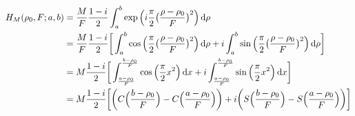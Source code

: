         \begin{align*}
            H_{M}(\rho_0,F;a,b)
            &=\frac{M}{F}\frac{1-i}{2}
                \int_{a}^{b}
                \exp\Big(i\frac{\pi}{2}
                \big(\frac{\rho-\rho_0}{F}\big)^{2}\Big)
            \mathop{}\!\mathrm{d}{\rho}\\
            &=\frac{M}{F}\frac{1-i}{2}
                \bigg[\int_{a}^{b}
                \cos\Big(\frac{\pi}{2}
                \big(\frac{\rho-\rho_0}{F}\big)^{2}\Big)
            \mathop{}\!\mathrm{d}{\rho}+
            i\int_{a}^{b}
                \sin\Big(\frac{\pi}{2}
                \big(\frac{\rho-\rho_0}{F}\big)^{2}\Big)
                \mathop{}\!\mathrm{d}{\rho}\bigg]\\
            &=M\frac{1-i}{2}\bigg[
                \int_{\frac{a-\rho_0}{F}}^{\frac{b-\rho_0}{F}}
                \cos\Big(\frac{\pi}{2}x^{2}\Big)\mathop{}\!\mathrm{d}{x}+
            i\int_{\frac{a-\rho_0}{F}}^{\frac{b-\rho_0}{F}}
                \sin\Big(\frac{\pi}{2}x^{2}\Big)\mathop{}\!\mathrm{d}{x}
            \bigg]\\
            &=M\frac{1-i}{2}
                \bigg[\bigg(C\Big(\frac{b-\rho_{0}}{F}\Big)-
                    C\Big(\frac{a-\rho_0}{F}\Big)\bigg)
                +i\bigg(S\Big(\frac{b-\rho_0}{F}\Big)-
                    S\Big(\frac{a-\rho_0}{F}\Big)\bigg)\bigg]
        \end{align*}
